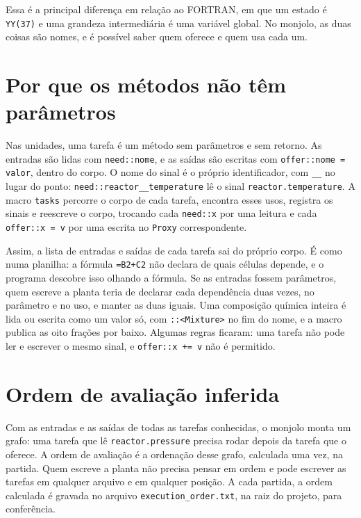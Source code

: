 Essa é a principal diferença em relação ao FORTRAN, em que um estado é \texttt{YY(37)} e uma grandeza intermediária é uma variável global. No monjolo, as duas coisas são nomes, e é possível saber quem oferece e quem usa cada um.

\section{Por que os métodos não têm parâmetros}
\label{apC:parametros}

Nas unidades, uma tarefa é um método sem parâmetros e sem retorno. As entradas são lidas com \texttt{need::nome}, e as saídas são escritas com \texttt{offer::nome = valor}, dentro do corpo. O nome do sinal é o próprio identificador, com \texttt{\_\_} no lugar do ponto: \texttt{need::reactor\_\_temperature} lê o sinal \texttt{reactor.temperature}. A macro \texttt{tasks} percorre o corpo de cada tarefa, encontra esses usos, registra os sinais e reescreve o corpo, trocando cada \texttt{need::x} por uma leitura e cada \texttt{offer::x = v} por uma escrita no \texttt{Proxy} correspondente.

Assim, a lista de entradas e saídas de cada tarefa sai do próprio corpo. É como numa planilha: a fórmula \texttt{=B2+C2} não declara de quais células depende, e o programa descobre isso olhando a fórmula. Se as entradas fossem parâmetros, quem escreve a planta teria de declarar cada dependência duas vezes, no parâmetro e no uso, e manter as duas iguais. Uma composição química inteira é lida ou escrita como um valor só, com \texttt{::<Mixture>} no fim do nome, e a macro publica as oito frações por baixo. Algumas regras ficaram: uma tarefa não pode ler e escrever o mesmo sinal, e \texttt{offer::x += v} não é permitido.

\section{Ordem de avaliação inferida}
\label{apC:ordem}

Com as entradas e as saídas de todas as tarefas conhecidas, o monjolo monta um grafo: uma tarefa que lê \texttt{reactor.pressure} precisa rodar depois da tarefa que o oferece. A ordem de avaliação é a ordenação desse grafo, calculada uma vez, na partida. Quem escreve a planta não precisa pensar em ordem e pode escrever as tarefas em qualquer arquivo e em qualquer posição. A cada partida, a ordem calculada é gravada no arquivo \texttt{execution\_order.txt}, na raiz do projeto, para conferência.

